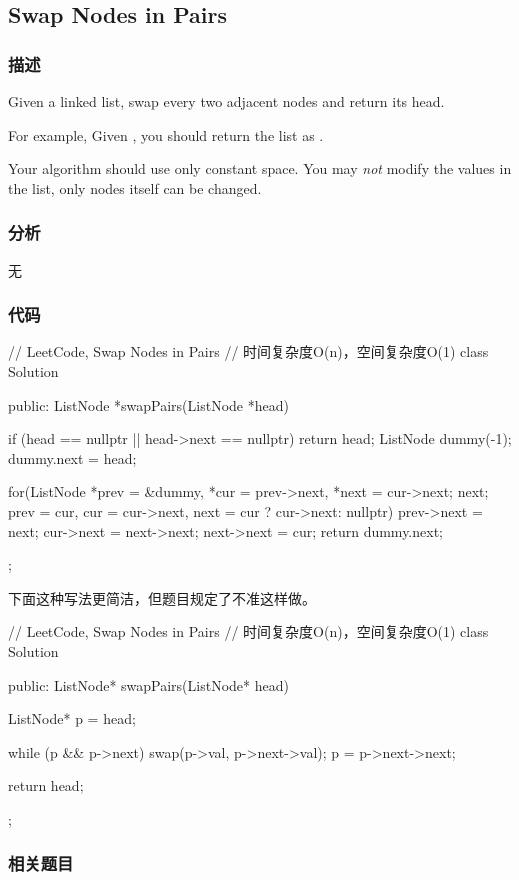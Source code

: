 \subsection{Swap Nodes in Pairs}
\label{sec:swap-nodes-in-pairs}


\subsubsection{描述}
Given a linked list, swap every two adjacent nodes and return its head.

For example,
Given , you should return the list as .

Your algorithm should use only constant space. You may \emph{not} modify the 
values in the list, only nodes itself can be changed.


\subsubsection{分析}
无


\subsubsection{代码}
\begin{Code}
	// LeetCode, Swap Nodes in Pairs
	// 时间复杂度O(n)，空间复杂度O(1)
	class Solution {
		public:
		ListNode *swapPairs(ListNode *head) {
			if (head == nullptr || head->next == nullptr) return head;
			ListNode dummy(-1);
			dummy.next = head;
			
			for(ListNode *prev = &dummy, *cur = prev->next, *next = cur->next;
			next;
			prev = cur, cur = cur->next, next = cur ? cur->next: nullptr) {
				prev->next = next;
				cur->next = next->next;
				next->next = cur;
			}
			return dummy.next;
		}
	};
\end{Code}

下面这种写法更简洁，但题目规定了不准这样做。
\begin{Code}
	// LeetCode, Swap Nodes in Pairs
	// 时间复杂度O(n)，空间复杂度O(1)
	class Solution {
		public:
		ListNode* swapPairs(ListNode* head) {
			ListNode* p = head;
			
			while (p && p->next) {
				swap(p->val, p->next->val);
				p = p->next->next;
			}
			
			return head;
		}
	};
\end{Code}

\subsubsection{相关题目}

